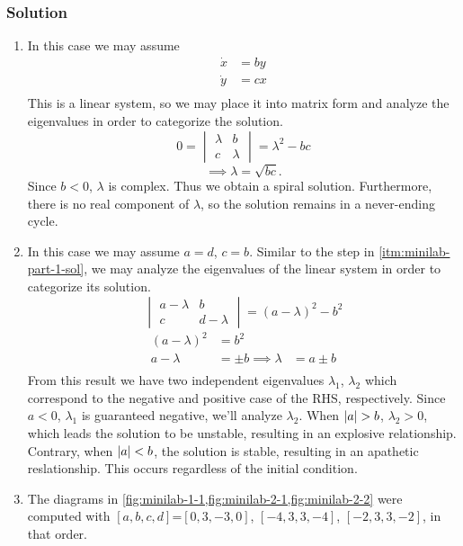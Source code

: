 \documentclass[12pt]{article}
\begin{document}
\subsubsection*{Solution}
\begin{enumerate}
\item
  \label{itm:minilab-part-1-sol}
  In this case we may assume
  \begin{equation*}
    \begin{aligned}
      \dot{x} &= by \\
      \dot{y} &= cx \\
    \end{aligned}
  \end{equation*}
  This is a linear system, so we may place it into matrix form and analyze the
  eigenvalues in order to categorize the solution.
  \begin{equation*}
    0=\begin{vmatrix} \lambda & b \\ c & \lambda \end{vmatrix} = \lambda^2-bc
  \end{equation*}
  \begin{equation*}
    \implies \lambda = \sqrt{bc}.
  \end{equation*}
  Since $b<0$, $\lambda$ is complex. Thus we obtain a spiral solution.
  Furthermore, there is no real component of $\lambda$, so the solution remains
  in a never-ending cycle.
\item In this case we may assume $a=d$, $c=b$. Similar to the step in
  \cref{itm:minilab-part-1-sol}, we may analyze the eigenvalues of the linear
  system in order to categorize its solution.
  \begin{equation*}
    \begin{vmatrix} a-\lambda & b \\ c & d-\lambda \end{vmatrix} = {(a-\lambda)}^2-b^2
  \end{equation*}
  \begin{equation*}
    \begin{aligned}
      {(a-\lambda)}^2 &= b^2 \\
      a-\lambda &= \pm b
      \implies \lambda &= a\pm b \\
    \end{aligned}
  \end{equation*}
  From this result we have two independent eigenvalues $\lambda_1$, $\lambda_2$
  which correspond to the negative and positive case of the RHS, respectively.
  Since $a<0$, $\lambda_1$ is guaranteed negative, we'll analyze $\lambda_2$.
  When $\abs{a}>b$, $\lambda_2>0$, which leads the solution to be unstable,
  resulting in an explosive relationship. Contrary, when $\left|{a}\right|<b$, the
  solution is stable, resulting in an apathetic reslationship. This occurs
  regardless of the initial condition.
\item The diagrams in \cref{fig:minilab-1-1,fig:minilab-2-1,fig:minilab-2-2}
  were computed with $[a, b, c, d]$=$[0, 3, -3, 0]$, $[-4, 3, 3, -4]$,
  $[-2, 3, 3, -2]$, in that order.

\end{enumerate}
\end{document}
